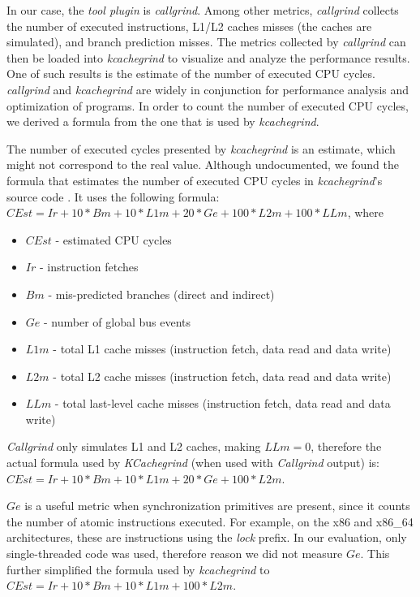 In our case, the \textit{tool plugin} is \textit{callgrind}. Among other metrics, \textit{callgrind}
collects the number of executed instructions, L1/L2 caches misses (the caches are simulated), and branch
prediction misses. The metrics collected by \textit{callgrind} can then be loaded into \textit{kcachegrind}
to visualize and analyze the performance results. One of such results is the estimate of the number of executed CPU cycles.
\textit{callgrind} and \textit{kcachegrind} are widely in conjunction for performance analysis and optimization
of programs. In order to count the number of executed CPU cycles, we derived a formula from
the one that is used by \textit{kcachegrind}.

The number of executed cycles
presented by \textit{kcachegrind} is an estimate, which might not correspond to the real value.
Although undocumented, we found the formula that estimates the number of executed CPU cycles in
\textit{kcachegrind}'s source code \cite{cachegrind_source:online}.
It uses the
following formula: $CEst = Ir + 10*Bm + 10*L1m + 20*Ge + 100*L2m + 100*LLm$, where

\begin{itemize}
  \item $CEst$ - estimated CPU cycles
  \item $Ir$ - instruction fetches
  \item $Bm$ -  mis-predicted branches (direct and indirect)
  \item $Ge$ - number of global bus events
  \item $L1m$ - total L1 cache misses (instruction fetch, data read and data write)
  \item $L2m$ - total L2 cache misses (instruction fetch, data read and data write)
  \item $LLm$ - total last-level cache misses (instruction fetch, data read and data write)
\end{itemize}

\textit{Callgrind} only simulates L1 and L2 caches, making $LLm=0$, therefore the actual formula
used by \textit{KCachegrind} (when used with \textit{Callgrind} output) is:
$CEst = Ir + 10*Bm + 10*L1m + 20*Ge + 100*L2m$.

$Ge$ is a useful metric when synchronization primitives are present, since it counts the number of
atomic instructions executed. For example, on the x86 and x86\_64 architectures, these are
instructions using the \textit{lock} prefix. In our evaluation, only single-threaded code was used, therefore
reason we did not measure $Ge$. This further simplified the formula used by \textit{kcachegrind} to
$CEst = Ir + 10*Bm + 10*L1m + 100*L2m$.

